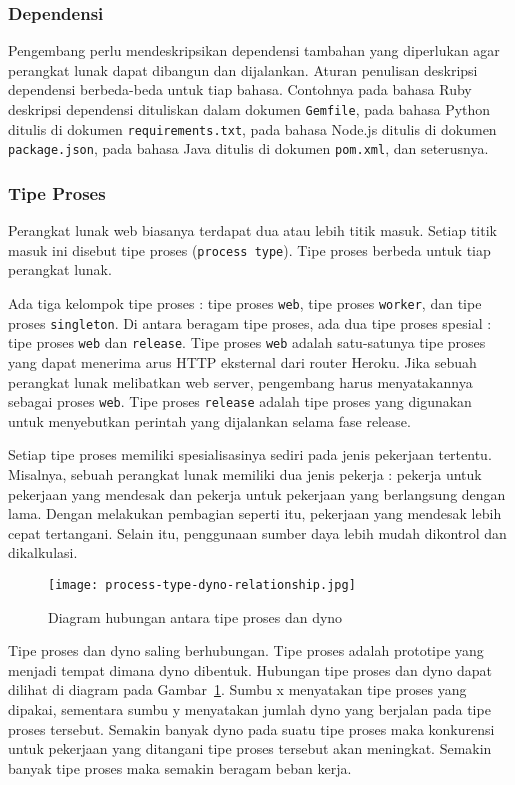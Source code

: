 \subsubsection{Dependensi}
Pengembang perlu mendeskripsikan dependensi tambahan yang diperlukan agar perangkat lunak dapat dibangun dan dijalankan. Aturan penulisan deskripsi dependensi berbeda-beda untuk tiap bahasa. Contohnya pada bahasa Ruby deskripsi dependensi dituliskan dalam dokumen \texttt{Gemfile}, pada bahasa Python ditulis di dokumen \texttt{requirements.txt}, pada bahasa Node.js ditulis di dokumen \texttt{package.json}, pada bahasa Java ditulis di dokumen \texttt{pom.xml}, dan seterusnya.

\subsubsection{Tipe Proses}
Perangkat lunak web biasanya terdapat dua atau lebih titik masuk. Setiap titik masuk ini disebut tipe proses (\texttt{process type}). Tipe proses berbeda untuk tiap perangkat lunak.

Ada tiga kelompok tipe proses : tipe proses \texttt{web}, tipe proses \texttt{worker}, dan tipe proses \texttt{singleton}. Di antara beragam tipe proses, ada dua tipe proses spesial : tipe proses \texttt{web} dan \texttt{release}. Tipe proses \texttt{web} adalah satu-satunya tipe proses yang dapat menerima arus HTTP eksternal dari router Heroku. Jika sebuah perangkat lunak melibatkan web server, pengembang harus menyatakannya sebagai proses \texttt{web}. Tipe proses \texttt{release} adalah tipe proses yang digunakan untuk menyebutkan perintah yang dijalankan selama fase release.

Setiap tipe proses memiliki spesialisasinya sediri pada jenis pekerjaan tertentu. Misalnya, sebuah perangkat lunak memiliki dua jenis pekerja : pekerja untuk pekerjaan yang mendesak dan pekerja untuk pekerjaan yang berlangsung dengan lama. Dengan melakukan pembagian seperti itu, pekerjaan yang mendesak lebih cepat tertangani. Selain itu, penggunaan sumber daya lebih mudah dikontrol dan dikalkulasi.

\begin{figure}[H]
	\centering  
	\texttt{[image: process-type-dyno-relationship.jpg]}  
	\caption[Diagram hubungan antara tipe proses dan dyno]{Diagram hubungan antara tipe proses dan dyno} 
	\label{fig:process-type-dyno-relationship} 
\end{figure}

Tipe proses dan dyno saling berhubungan. Tipe proses adalah prototipe yang menjadi tempat dimana dyno dibentuk. Hubungan tipe proses dan dyno dapat dilihat di diagram pada Gambar~\ref{fig:process-type-dyno-relationship}. Sumbu x menyatakan tipe proses yang dipakai, sementara sumbu y menyatakan jumlah dyno yang berjalan pada tipe proses tersebut. Semakin banyak dyno pada suatu tipe proses maka konkurensi untuk pekerjaan yang ditangani tipe proses tersebut akan meningkat. Semakin banyak tipe proses maka semakin beragam beban kerja.

